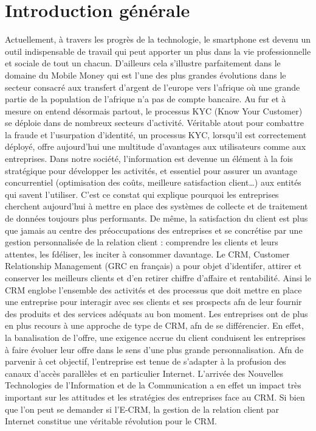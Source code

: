 
\chapter*{Introduction générale}
Actuellement, à travers les progrès de la technologie, le smartphone est devenu un outil
indispensable de travail qui peut apporter un plus dans la vie professionnelle et sociale de tout
un chacun. D’ailleurs cela s’illustre parfaitement dans le domaine du Mobile Money qui est
l’une des plus grandes évolutions dans le secteur consacré aux transfert d'argent 
de l’europe vers l'afrique où une grande partie de la population de 
l'afrique  n'a pas de compte bancaire.\newline
Au fur et à mesure on entend désormais partout, le processus KYC (Know Your Customer) se déploie dans de nombreux secteurs d’activité. Véritable atout pour combattre la fraude et l’usurpation d’identité, un processus KYC, lorsqu’il est correctement déployé, offre aujourd’hui une multitude d’avantages aux utilisateurs comme aux entreprises.\newline
Dans notre société, l’information est devenue un élément à la fois stratégique pour développer les
activités, et essentiel pour assurer un avantage concurrentiel (optimisation des coûts, meilleure
satisfaction client…) aux entités qui savent l’utiliser. C’est ce constat qui explique pourquoi les
entreprises cherchent aujourd’hui à mettre en place des systèmes de collecte et de traitement de
données toujours plus performants.
De même, la satisfaction du client est plus que jamais au centre des préoccupations des entreprises et
se concrétise par une gestion personnalisée de la relation client : comprendre les clients et leurs
attentes, les fdéliser, les inciter à consommer davantage. Le CRM, Customer Relationship
Management (GRC en français) a pour objet d'identifer, attirer et conserver les meilleurs clients et
d'en retirer chiffre d'affaire et rentabilité.
Ainsi le CRM englobe l'ensemble des activités et des processus que doit mettre en place une entreprise
pour interagir avec ses clients et ses prospects afn de leur fournir des produits et des services adéquats
au bon moment. Les entreprises ont de plus en plus recours à une approche de type de CRM, afn de se 
différencier. En effet, la banalisation de l'offre, une exigence accrue du client conduisent les
entreprises à faire évoluer leur offre dans le sens d'une plus grande personnalisation. Afn de parvenir
à cet objectif, l'entreprise est tenue de s'adapter à la profusion des canaux d'accès parallèles et en
particulier Internet.
L'arrivée des Nouvelles Technologies de l'Information et de la Communication a en effet un impact
très important sur les attitudes et les stratégies des entreprises face au CRM. Si bien que l'on peut se
demander si l'E-CRM, la gestion de la relation client par Internet constitue une véritable révolution
pour le CRM.





